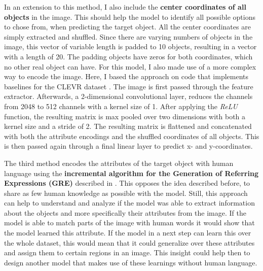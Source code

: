 In an extension to this method, I also include the \textbf{center coordinates of all objects} in the image.
This should help the model to identify all possible options to chose from, when predicting the target object.
All the center coordinates are simply extracted and shuffled.
Since there are varying numbers of objects in the image, this vector of variable length is padded to 10 objects, resulting in a vector with a length of 20.
The padding objects have zeros for both coordinates, which no other real object can have.
For this model, I also made use of a more complex way to encode the image.
Here, I based the approach on code that implements baselines for the CLEVR dataset \citep{Johnson2017}. 
The image is first passed through the feature extractor.
Afterwards, a 2-dimensional convolutional layer, reduces the channels from 2048 to 512 channels with a kernel size of 1.
After applying the \emph{ReLU} function, the resulting matrix is max pooled over two dimensions with both a kernel size and a stride of 2.
The resulting matrix is flattened and concatenated with both the attribute encodings and the shuffled coordinates of all objects.
This is then passed again through a final linear layer to predict x- and y-coordinates.

The third method encodes the attributes of the target object with human language using the \textbf{incremental algorithm for the Generation of Referring Expressions (GRE)} described in \citet{Dale1995}.
This opposes the idea described before, to share as few human knowledge as possible with the model.
Still, this approach can help to understand and analyze if the model was able to extract information about the objects and more specifically their attributes from the image.
If the model is able to match parts of the image with human words it would show that the model learned this attribute.
If the model in a next step can learn this over the whole dataset, this would mean that it could generalize over these attributes and assign them to certain regions in an image.
This insight could help then to design another model that makes use of these learnings without human language.

